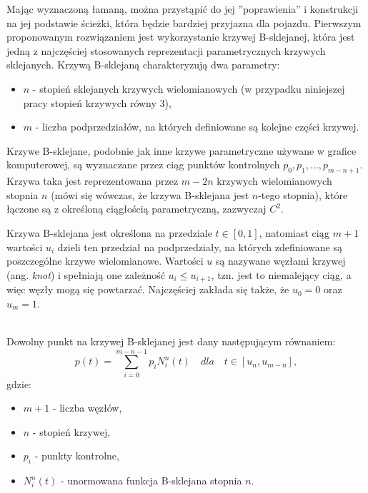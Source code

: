 \documentclass[a4paper,11pt,twoside]{report}
\theoremstyle{definition}
\begin{document}
Mając wyznaczoną łamaną, można przystąpić do jej ''poprawienia'' i konstrukcji na jej podstawie ścieżki, która będzie bardziej przyjazna dla pojazdu. Pierwszym proponowanym rozwiązaniem jest wykorzystanie krzywej B-sklejanej, która jest jedną z najczęściej stosowanych reprezentacji parametrycznych krzywych sklejanych. Krzywą B-sklejaną charakteryzują dwa parametry: 
\begin{itemize}
 \item \textbf{$n$} - stopień sklejanych krzywych wielomianowych (w przypadku niniejszej pracy stopień krzywych równy 3),
 \item \textbf{$m$} - liczba podprzedziałów, na których definiowane są kolejne części krzywej.
\end{itemize}

Krzywe B-sklejane, podobnie jak inne krzywe parametryczne używane w grafice komputerowej, są wyznaczane przez ciąg punktów kontrolnych $p_0, p_1, ..., p_{m-n+1}$. Krzywa taka jest reprezentowana przez $m - 2n$ krzywych wielomianowych stopnia $n$ (mówi się wówczas, że krzywa B-sklejana jest $n$-tego stopnia), które łączone są z określoną ciągłością parametryczną, zazwyczaj $C^{2}$.

Krzywa B-sklejana jest określona na przedziale $t \in [0, 1]$, natomiast ciąg $m + 1$ wartości $u_{i}$ dzieli ten przedział na podprzedziały, na których zdefiniowane są poszczególne krzywe wielomianowe. Wartości $u$ są nazywane węzłami krzywej (ang. \textit{knot}) i spełniają one zależność $u_{i} \leq u_{i+1}$, tzn. jest to niemalejący ciąg, a więc węzły mogą się powtarzać. Najczęściej zakłada się także, że $u_0 = 0$ oraz $u_{m} = 1$.

~\\Dowolny punkt na krzywej B-sklejanej jest dany następującym równaniem:
$$
p(t) = \sum_{i = 0}^{m - n - 1} p_{i} N^{n}_{i}(t) \quad dla \quad t \in [u_{n}, u_{m - n}],
$$
gdzie:
\begin{itemize}
	\item $m + 1$ - liczba węzłów,
	\item $n$ - stopień krzywej,
	\item $p_{i}$ - punkty kontrolne,
	\item $N^{n}_{i}(t)$ - unormowana funkcja B-sklejana stopnia $n$.
\end{itemize}
\end{document}
